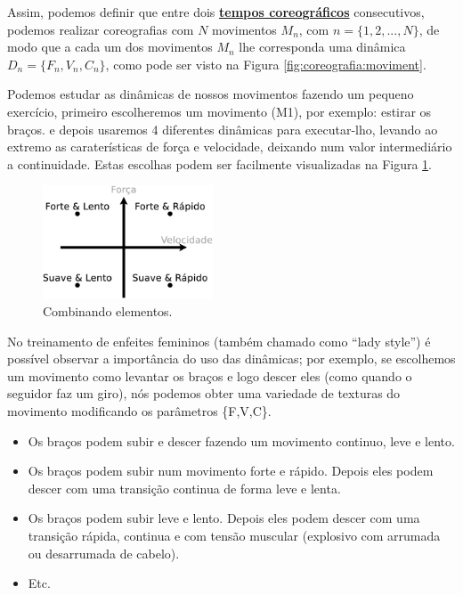 Assim, podemos definir que entre dois \hyperref[sec:TemposCoreograficos]{\textbf{tempos coreográficos}} consecutivos,
podemos realizar coreografias com $N$ movimentos $M_n$, com $n=\{1, 2, ..., N\}$, 
de modo que a cada um dos movimentos $M_n$ lhe corresponda uma dinâmica $D_n=\{F_n, V_n, C_n\}$,
como pode ser visto na Figura \ref{fig:coreografia:moviment}.
\begin{example}
Podemos estudar as dinâmicas de nossos movimentos fazendo um pequeno exercício,
primeiro escolheremos um movimento (M1), por exemplo: estirar os braços.
e depois usaremos 4 diferentes dinâmicas para executar-lho, 
levando ao extremo as caraterísticas de força e velocidade, 
deixando num valor intermediário a continuidade.
Estas escolhas podem ser facilmente visualizadas na Figura \ref{fig:element:moviment2}.
\end{example}


\begin{figure}[!h]
  \centering
    \includegraphics[width=0.45\textwidth]{chapters/cap-musicalidade/dinamicas-elementos2.eps}
\caption{Combinando elementos.}
\label{fig:element:moviment2}
\end{figure}

\begin{example}
No treinamento de enfeites femininos (também chamado como ``lady style'')
é possível observar a importância do uso das dinâmicas;
por exemplo, se escolhemos um movimento  
como levantar os braços e logo descer eles (como quando o seguidor faz um giro),
nós podemos obter uma variedade de texturas do movimento 
modificando os parâmetros  \{F,V,C\}.
\begin{itemize}
\item Os braços podem subir e descer fazendo um movimento continuo, leve e lento.
\item Os braços podem subir num movimento forte e rápido. 
Depois eles podem descer com uma transição continua de forma leve e lenta.
\item Os braços podem subir leve e lento.
Depois eles podem descer com uma transição rápida, continua e com tensão muscular 
(explosivo com arrumada ou desarrumada de cabelo). 
\item Etc.
\end{itemize}
\end{example}

